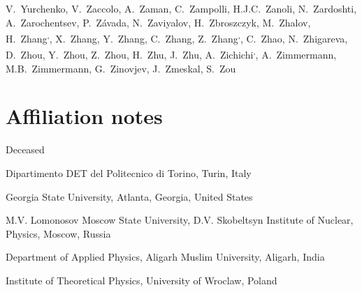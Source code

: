 \begin{flushleft}
V.~Yurchenko\And, 
V.~Zaccolo\And, 
A.~Zaman\And, 
C.~Zampolli\And, 
H.J.C.~Zanoli\And, 
N.~Zardoshti\And, 
A.~Zarochentsev\And, 
P.~Z\'{a}vada\And, 
N.~Zaviyalov\And, 
H.~Zbroszczyk\And, 
M.~Zhalov\And, 
H.~Zhang\textsuperscript{,}\And, 
X.~Zhang\And, 
Y.~Zhang\And, 
C.~Zhang\And, 
Z.~Zhang\textsuperscript{,}\And, 
C.~Zhao\And, 
N.~Zhigareva\And, 
D.~Zhou\And, 
Y.~Zhou\And, 
Z.~Zhou\And, 
H.~Zhu\And, 
J.~Zhu\And, 
A.~Zichichi\textsuperscript{,}\And, 
A.~Zimmermann\And, 
M.B.~Zimmermann\And, 
G.~Zinovjev\And, 
J.~Zmeskal\And, 
S.~Zou\And
\renewcommand\labelenumi{\textsuperscript{\theenumi}~}

\section*{Affiliation notes}
\renewcommand\theenumi{\roman{enumi}}
\begin{Authlist}
\item {}Deceased
\item {}Dipartimento DET del Politecnico di Torino, Turin, Italy
\item {}Georgia State University, Atlanta, Georgia, United States
\item {}M.V. Lomonosov Moscow State University, D.V. Skobeltsyn Institute of Nuclear, Physics, Moscow, Russia
\item {}Department of Applied Physics, Aligarh Muslim University, Aligarh, India
\item {}Institute of Theoretical Physics, University of Wroclaw, Poland
\end{Authlist}


\end{flushleft}
